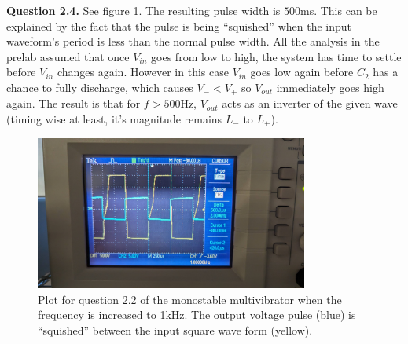 \documentclass[letterpaper, reqno,11pt]{article}
\begin{document}
{\medskip\noindent\bf Question 2.4.} See figure \ref{fig:2-4}. The resulting pulse width is $500$ms. This can be explained by the fact that the pulse is being ``squished'' when the input waveform's period is less than the normal pulse width. All the analysis in the prelab assumed that once $V_{in}$ goes from low to high, the system has time to settle before $V_{in}$ changes again. However in this case $V_{in}$ goes low again before $C_2$ has a chance to fully discharge, which causes $V_- <V_+$ so $V_{out}$ immediately goes high again. The result is that for $f>500$Hz, $V_{out}$ acts as an inverter of the given wave (timing wise at least, it's magnitude remains $L_-$ to $L_+$). 

\begin{figure}[htpb]
    \centering
    \includegraphics[width=0.8\textwidth]{2-4}
    \caption{Plot for question 2.2 of the monostable multivibrator when the frequency is increased to 1kHz. The output voltage pulse (blue) is ``squished'' between the input square wave form (yellow).}
    \label{fig:2-4}
\end{figure}
\end{document}
